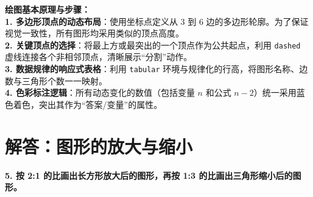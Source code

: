 \documentclass[12pt, a4paper]{ctexrep}
\begin{document}
\vspace{0.6cm}

{\small\color{blue!70!black}
\textbf{绘图基本原理与步骤：}\\
\textbf{1. 多边形顶点的动态布局}：使用坐标点定义从 $3$ 到 $6$ 边的多边形轮廓。为了保证视觉一致性，所有图形均采用类似的顶点高度。\\
\textbf{2. 关键顶点的选择}：将最上方或最突出的一个顶点作为公共起点，利用 \texttt{dashed} 虚线连接各个非相邻顶点，清晰展示“分割”动作。\\
\textbf{3. 数据规律的响应式表格}：利用 \texttt{tabular} 环境与规律化的行高，将图形名称、边数与三角形个数一一映射。\\
\textbf{4. 色彩标注逻辑}：所有动态变化的数值（包括变量 $n$ 和公式 $n-2$）统一采用蓝色着色，突出其作为“答案/变量”的属性。
}



\newpage

\section{解答：图形的放大与缩小}

\vspace{0.4cm}

\noindent\textbf{5. 按 2:1 的比画出长方形放大后的图形，再按 1:3 的比画出三角形缩小后的图形。}

\vspace{0.8cm}

\end{document}
